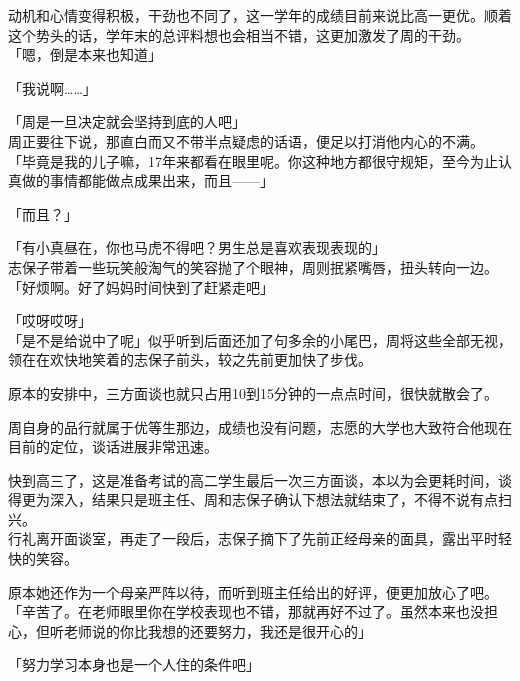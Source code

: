 动机和心情变得积极，干劲也不同了，这一学年的成绩目前来说比高一更优。顺着这个势头的话，学年末的总评料想也会相当不错，这更加激发了周的干劲。\\

「嗯，倒是本来也知道」

「我说啊……」

「周是一旦决定就会坚持到底的人吧」\\

周正要往下说，那直白而又不带半点疑虑的话语，便足以打消他内心的不满。\\

「毕竟是我的儿子嘛，17年来都看在眼里呢。你这种地方都很守规矩，至今为止认真做的事情都能做点成果出来，而且——」

「而且？」

「有小真昼在，你也马虎不得吧？男生总是喜欢表现表现的」\\

志保子带着一些玩笑般淘气的笑容抛了个眼神，周则抿紧嘴唇，扭头转向一边。\\

「好烦啊。好了妈妈时间快到了赶紧走吧」

「哎呀哎呀」\\

「是不是给说中了呢」似乎听到后面还加了句多余的小尾巴，周将这些全部无视，领在在欢快地笑着的志保子前头，较之先前更加快了步伐。\\

\vspace{2\baselineskip}

原本的安排中，三方面谈也就只占用10到15分钟的一点点时间，很快就散会了。

周自身的品行就属于优等生那边，成绩也没有问题，志愿的大学也大致符合他现在目前的定位，谈话进展非常迅速。

快到高三了，这是准备考试的高二学生最后一次三方面谈，本以为会更耗时间，谈得更为深入，结果只是班主任、周和志保子确认下想法就结束了，不得不说有点扫兴。\\

行礼离开面谈室，再走了一段后，志保子摘下了先前正经母亲的面具，露出平时轻快的笑容。

原本她还作为一个母亲严阵以待，而听到班主任给出的好评，便更加放心了吧。\\

「辛苦了。在老师眼里你在学校表现也不错，那就再好不过了。虽然本来也没担心，但听老师说的你比我想的还要努力，我还是很开心的」

「努力学习本身也是一个人住的条件吧」\\

